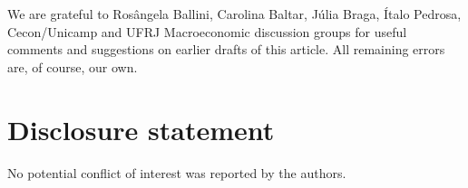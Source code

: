 \noindent We are grateful to  Rosângela Ballini, Carolina Baltar, Júlia Braga, Ítalo Pedrosa, Cecon/Unicamp and UFRJ Macroeconomic discussion groups for useful comments and suggestions on earlier drafts of this article. All remaining errors are, of course, our own.

\section*{Disclosure statement}

\noindent No potential conflict of interest was reported by the authors.


\printbibliography{}

\begin{appendix}
	
\end{appendix}

